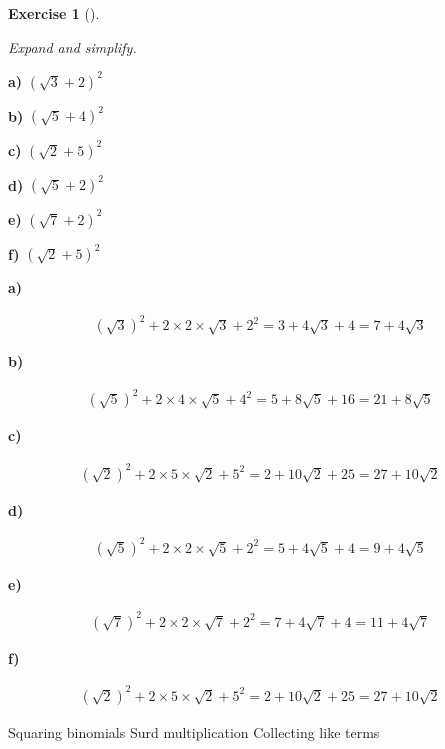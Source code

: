\documentclass[
  letterpaper,
  DIV=11,
  numbers=noendperiod]{scrreprt}
\theoremstyle{definition}
\newtheorem{exercise}{Exercise}[chapter]
\theoremstyle{remark}
\begin{document}
\begin{exercise}[]\protect\hypertarget{exr-u2-50}{}\label{exr-u2-50}

\emph{Expand and simplify.}

\textbf{a)} \(\displaystyle (\sqrt{3}+2)^2\)

\textbf{b)} \(\displaystyle (\sqrt{5}+4)^2\)

\textbf{c)} \(\displaystyle (\sqrt{2}+5)^2\)

\textbf{d)} \(\displaystyle (\sqrt{5}+2)^2\)

\textbf{e)} \(\displaystyle (\sqrt{7}+2)^2\)

\textbf{f)} \(\displaystyle (\sqrt{2}+5)^2\)

\begin{tcolorbox}[enhanced jigsaw, opacitybacktitle=0.6, coltitle=black, arc=.35mm, colframe=quarto-callout-tip-color-frame, colback=white, bottomrule=.15mm, left=2mm, colbacktitle=quarto-callout-tip-color!10!white, titlerule=0mm, opacityback=0, title=\textcolor{quarto-callout-tip-color}{\faLightbulb}\hspace{0.5em}{🔍 View Solutions}, leftrule=.75mm, breakable, rightrule=.15mm, bottomtitle=1mm, toptitle=1mm, toprule=.15mm]

\textbf{a)}

\[
\begin{aligned}
(\sqrt{3})^2+2\times 2\times\sqrt{3}+2^2=3+4\sqrt{3}+4=7+4\sqrt{3}
\end{aligned}
\]

\textbf{b)}

\[
\begin{aligned}
(\sqrt{5})^2+2\times 4\times\sqrt{5}+4^2=5+8\sqrt{5}+16=21+8\sqrt{5}
\end{aligned}
\]

\textbf{c)}

\[
\begin{aligned}
(\sqrt{2})^2+2\times 5\times\sqrt{2}+5^2=2+10\sqrt{2}+25=27+10\sqrt{2}
\end{aligned}
\]

\textbf{d)}

\[
\begin{aligned}
(\sqrt{5})^2+2\times 2\times\sqrt{5}+2^2=5+4\sqrt{5}+4=9+4\sqrt{5}
\end{aligned}
\]

\textbf{e)}

\[
\begin{aligned}
(\sqrt{7})^2+2\times 2\times\sqrt{7}+2^2=7+4\sqrt{7}+4=11+4\sqrt{7}
\end{aligned}
\]

\textbf{f)}

\[
\begin{aligned}
(\sqrt{2})^2+2\times 5\times\sqrt{2}+5^2=2+10\sqrt{2}+25=27+10\sqrt{2}
\end{aligned}
\]

\end{tcolorbox}

{Squaring binomials} {Surd multiplication} {Collecting like terms}

\end{exercise}
\end{document}
